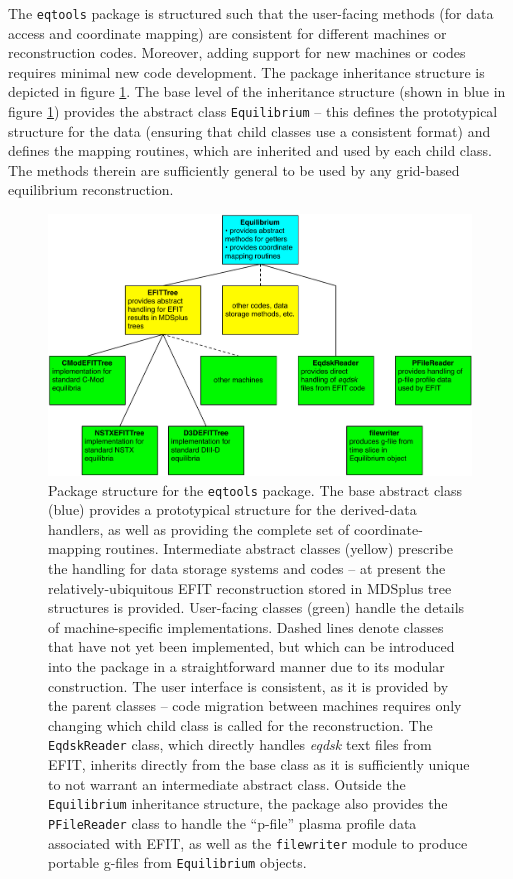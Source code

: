 \documentclass{elsarticle}
\newcommand{\eqtools}{\texttt{eqtools}\xspace}
\begin{document}
The \eqtools package is structured such that the user-facing methods (for data access and coordinate mapping) are consistent for different machines or reconstruction codes.
Moreover, adding support for new machines or codes requires minimal new code development.  
The package inheritance structure is depicted in figure \ref{fig:flowchart}.  
The base level of the inheritance structure (shown in blue in figure \ref{fig:flowchart}) provides the abstract class \verb|Equilibrium| -- this defines the prototypical structure for the data (ensuring that child classes use a consistent format) and defines the mapping routines, which are inherited and used by each child class.  
The methods therein are sufficiently general to be used by any grid-based equilibrium reconstruction.

\begin{figure}[p]
 \includegraphics[width=\textwidth]{graphics/flowchart_new.pdf}
 \caption{Package structure for the \eqtools package.  The base abstract class (blue) provides a prototypical structure for the derived-data handlers, as well as providing the complete set of coordinate-mapping routines.  Intermediate abstract classes (yellow) prescribe the handling for data storage systems and codes -- at present the relatively-ubiquitous EFIT reconstruction stored in MDSplus tree structures is provided.  User-facing classes (green) handle the details of machine-specific implementations.  Dashed lines denote classes that have not yet been implemented, but which can be introduced into the package in a straightforward manner due to its modular construction.  The user interface is consistent, as it is provided by the parent classes -- code migration between machines requires only changing which child class is called for the reconstruction.  The \texttt{EqdskReader} class, which directly handles \emph{eqdsk} text files from EFIT, inherits directly from the base class as it is sufficiently unique to not warrant an intermediate abstract class.  Outside the \texttt{Equilibrium} inheritance structure, the package also provides the \texttt{PFileReader} class to handle the ``p-file'' plasma profile data associated with EFIT, as well as the \texttt{filewriter} module to produce portable g-files from \texttt{Equilibrium} objects.}
 \label{fig:flowchart}
\end{figure}
\end{document}
